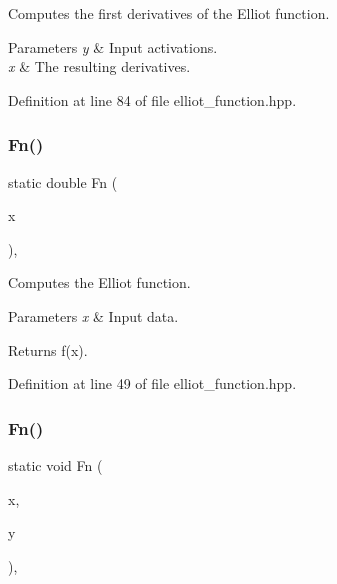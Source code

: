 Computes the first derivatives of the Elliot function. 


\begin{DoxyParams}{Parameters}
{\em y} & Input activations. \\
\hline
{\em x} & The resulting derivatives. \\
\hline
\end{DoxyParams}


Definition at line 84 of file elliot\+\_\+function.\+hpp.

\mbox{\label{classmlpack_1_1ann_1_1ElliotFunction_a11bd9a1195e6b107f9fee73643bc328b}} 
\subsubsection{Fn()\hspace{0.1cm}{\footnotesize\ttfamily [1/2]}}
{\footnotesize\ttfamily static double Fn (\begin{DoxyParamCaption}\item[{const double}]{x }\end{DoxyParamCaption})\hspace{0.3cm}{\ttfamily [inline]}, {\ttfamily [static]}}



Computes the Elliot function. 


\begin{DoxyParams}{Parameters}
{\em x} & Input data. \\
\hline
\end{DoxyParams}
\begin{DoxyReturn}{Returns}
f(x). 
\end{DoxyReturn}


Definition at line 49 of file elliot\+\_\+function.\+hpp.

\mbox{\label{classmlpack_1_1ann_1_1ElliotFunction_af6cf5da90eb6312e3e25c9b8bd9c3527}} 
\subsubsection{Fn()\hspace{0.1cm}{\footnotesize\ttfamily [2/2]}}
{\footnotesize\ttfamily static void Fn (\begin{DoxyParamCaption}\item[{const Input\+Vec\+Type \&}]{x,  }\item[{Output\+Vec\+Type \&}]{y }\end{DoxyParamCaption})\hspace{0.3cm}{\ttfamily [inline]}, {\ttfamily [static]}}



